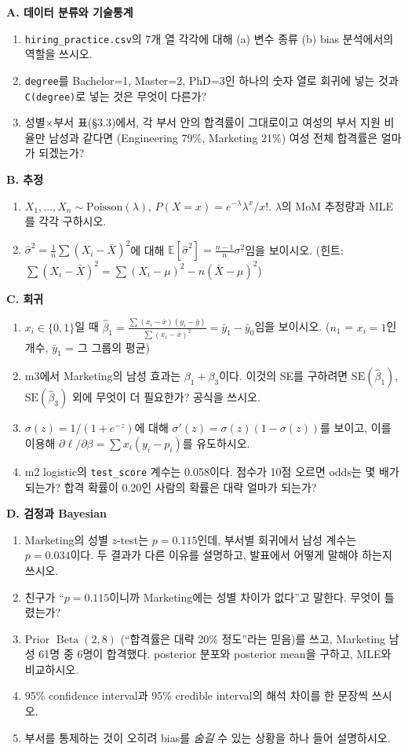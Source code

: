 \documentclass[11pt,a4paper]{article}
\newcommand{\E}{\mathbb{E}}
\newcommand{\BetaD}{\operatorname{Beta}}
\newcommand{\code}[1]{\texttt{#1}}
\begin{document}
\begin{probbox}
\textbf{A. 데이터 분류와 기술통계}
\begin{enumerate}
\item \code{hiring\_practice.csv}의 7개 열 각각에 대해 (a) 변수 종류 (b) bias 분석에서의 역할을 쓰시오.
\item \code{degree}를 Bachelor=1, Master=2, PhD=3인 하나의 숫자 열로 회귀에 넣는 것과 \code{C(degree)}로 넣는 것은 무엇이 다른가?
\item 성별$\times$부서 표(\S3.3)에서, 각 부서 안의 합격률이 그대로이고 여성의 부서 지원 비율만 남성과 같다면 (Engineering 79\%, Marketing 21\%) 여성 전체 합격률은 얼마가 되겠는가?
\end{enumerate}

\textbf{B. 추정}
\begin{enumerate}[resume]
\item $X_1,\dots,X_n\sim\text{Poisson}(\lambda)$, $P(X=x)=e^{-\lambda}\lambda^x/x!$. $\lambda$의 MoM 추정량과 MLE를 각각 구하시오.
\item $\hat\sigma^2=\frac1n\sum(X_i-\bar X)^2$에 대해 $\E[\hat\sigma^2]=\frac{n-1}n\sigma^2$임을 보이시오. (힌트: $\sum(X_i-\bar X)^2=\sum(X_i-\mu)^2-n(\bar X-\mu)^2$)
\end{enumerate}

\textbf{C. 회귀}
\begin{enumerate}[resume]
\item $x_i\in\{0,1\}$일 때 $\hat\beta_1=\frac{\sum(x_i-\bar x)(y_i-\bar y)}{\sum(x_i-\bar x)^2}=\bar y_1-\bar y_0$임을 보이시오. ($n_1$ = $x_i=1$인 개수, $\bar y_1$ = 그 그룹의 평균)
\item m3에서 Marketing의 남성 효과는 $\beta_1+\beta_3$이다. 이것의 SE를 구하려면 $\mathrm{SE}(\hat\beta_1)$, $\mathrm{SE}(\hat\beta_3)$ 외에 무엇이 더 필요한가? 공식을 쓰시오.
\item $\sigma(z)=1/(1+e^{-z})$에 대해 $\sigma'(z)=\sigma(z)(1-\sigma(z))$를 보이고, 이를 이용해 $\partial\ell/\partial\beta=\sum x_i(y_i-p_i)$를 유도하시오.
\item m2 logistic의 \code{test\_score} 계수는 0.058이다. 점수가 10점 오르면 odds는 몇 배가 되는가? 합격 확률이 0.20인 사람의 확률은 대략 얼마가 되는가?
\end{enumerate}

\textbf{D. 검정과 Bayesian}
\begin{enumerate}[resume]
\item Marketing의 성별 $z$-test는 $p=0.115$인데, 부서별 회귀에서 남성 계수는 $p=0.034$이다. 두 결과가 다른 이유를 설명하고, 발표에서 어떻게 말해야 하는지 쓰시오.
\item 친구가 ``$p=0.115$이니까 Marketing에는 성별 차이가 없다''고 말한다. 무엇이 틀렸는가?
\item Prior $\BetaD(2,8)$ (``합격률은 대략 20\% 정도''라는 믿음)를 쓰고, Marketing 남성 61명 중 6명이 합격했다. posterior 분포와 posterior mean을 구하고, MLE와 비교하시오.
\item 95\% confidence interval과 95\% credible interval의 해석 차이를 한 문장씩 쓰시오.
\item 부서를 통제하는 것이 오히려 bias를 \emph{숨길} 수 있는 상황을 하나 들어 설명하시오.
\end{enumerate}
\end{probbox}
\end{document}
